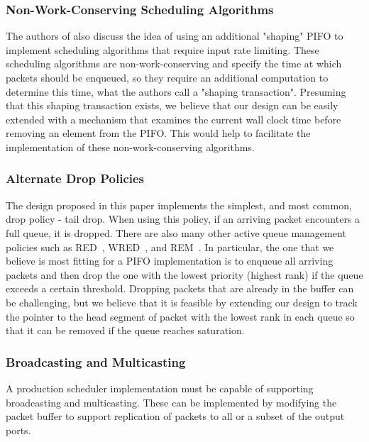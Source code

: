 \subsubsection*{Non-Work-Conserving Scheduling Algorithms}
The authors of \cite{pifo2016} also discuss the idea of using an additional "shaping" PIFO to implement scheduling algorithms that require input rate limiting. These scheduling algorithms are non-work-conserving and specify the time at which packets should be enqueued, so they require an additional computation to determine this time, what the authors call a "shaping transaction". Presuming that this shaping transaction exists, we believe that our design can be easily extended with a mechanism that examines the current wall clock time before removing an element from the PIFO. This would help to facilitate the implementation of these non-work-conserving algorithms.


\subsubsection*{Alternate Drop Policies}
The design proposed in this paper implements the simplest, and most common, drop policy - tail drop. When using this policy, if an arriving packet encounters a full queue, it is dropped. There are also many other active queue management policies such as RED~\cite{red}, WRED~\cite{wred}, and REM~\cite{rem}. In particular, the one that we believe is most fitting for a PIFO implementation is to enqueue all arriving packets and then drop the one with the lowest priority (highest rank) if the queue exceeds a certain threshold. Dropping packets that are already in the buffer can be challenging, but we believe that it is feasible by extending our design to track the pointer to the head segment of packet with the lowest rank in each queue so that it can be removed if the queue reaches saturation.

\subsubsection*{Broadcasting and Multicasting}
A production scheduler implementation must be capable of supporting broadcasting and multicasting.  These can be implemented by modifying the packet buffer to support replication of packets to all or a subset of the output ports.







